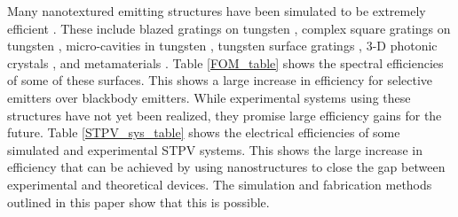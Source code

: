 \documentclass[10pt,letterpaper]{article}
\begin{document}
{Many nanotextured emitting structures have been simulated to be extremely efficient \cite{paper2_ref13}.  These include blazed gratings on tungsten \cite{me2}, complex square gratings on tungsten \cite{paper2_ref14}, micro-cavities in tungsten \cite{paper2_ref6}, tungsten surface gratings \cite{paper1_ref6}, 3-D photonic crystals \cite{paper2_ref10}, and metamaterials \cite{meta}.  Table \ref{FOM_table} shows the spectral efficiencies of some of these surfaces.  This shows a large increase in efficiency for selective emitters over blackbody emitters.  While experimental systems using these structures have not yet been realized, they promise large efficiency gains for the future.  Table \ref{STPV_sys_table} shows the electrical efficiencies of some simulated and experimental STPV systems.  This shows the large increase in efficiency that can be achieved by using nanostructures to close the gap between experimental and theoretical devices.  The simulation and fabrication methods outlined in this paper show that this is possible.

}
\end{document}
